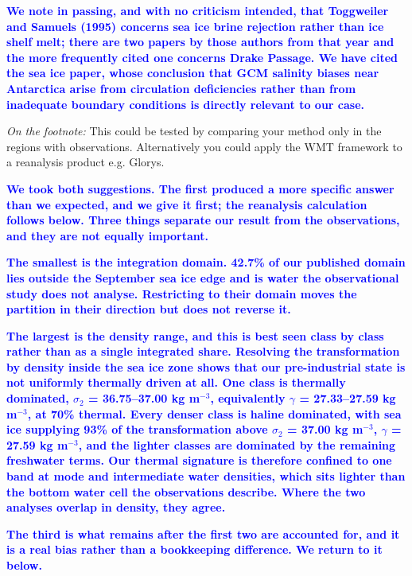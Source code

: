 \documentclass[pdflatex,sn-nature]{sn-jnl}
\begin{document}
\noindent\textcolor{blue}{\textbf{We note in passing, and with no criticism intended, that Toggweiler and Samuels (1995) concerns sea ice brine rejection rather than ice shelf melt; there are two papers by those authors from that year and the more frequently cited one concerns Drake Passage. We have cited the sea ice paper, whose conclusion that GCM salinity biases near Antarctica arise from circulation deficiencies rather than from inadequate boundary conditions is directly relevant to our case.}}


\medskip
\noindent \textit{On the footnote:}\textit{ }This could be tested by comparing your method only in the regions with observations. Alternatively you could apply the WMT framework to a reanalysis product e.g. Glorys.
\medskip

\noindent\textcolor{blue}{\textbf{We took both suggestions. The first produced a more specific answer than we expected, and we give it first; the reanalysis calculation follows below. Three things separate our result from the observations, and they are not equally important.}}


\noindent\textcolor{blue}{\textbf{The smallest is the integration domain. 42.7\% of our published domain lies outside the September sea ice edge and is water the observational study does not analyse. Restricting to their domain moves the partition in their direction but does not reverse it.}}


\noindent\textcolor{blue}{\textbf{The largest is the density range, and this is best seen class by class rather than as a single integrated share. Resolving the transformation by density inside the sea ice zone shows that our pre-industrial state is not uniformly thermally driven at all. One class is thermally dominated, $\sigma$$_2$ = 36.75--37.00 kg m$^{-3}$, equivalently $\gamma$ = 27.33--27.59 kg m$^{-3}$, at 70\% thermal. Every denser class is haline dominated, with sea ice supplying 93\% of the transformation above $\sigma$$_2$ = 37.00 kg m$^{-3}$, $\gamma$ = 27.59 kg m$^{-3}$, and the lighter classes are dominated by the remaining freshwater terms. Our thermal signature is therefore confined to one band at mode and intermediate water densities, which sits lighter than the bottom water cell the observations describe. Where the two analyses overlap in density, they agree.}}


\noindent\textcolor{blue}{\textbf{The third is what remains after the first two are accounted for, and it is a real bias rather than a bookkeeping difference. We return to it below.}}
\end{document}
